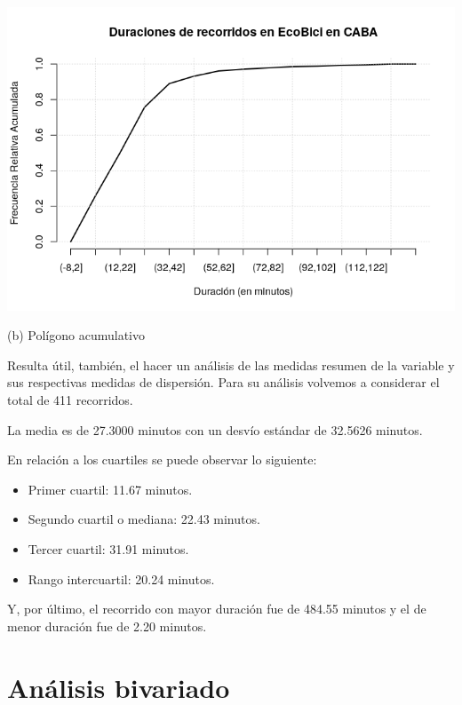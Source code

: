 \documentclass[11pt]{article}
\begin{document}
    \begin{center}
      \includegraphics[scale=0.55]{PoligAcumDuracion.png}
      \vspace{-4mm}
  
      (b) Pol\'igono acumulativo
    \end{center}

    Resulta \'util, tambi\'en, el hacer un an\'alisis de las medidas resumen de la variable y sus respectivas medidas de dispersi\'on.
    Para su an\'alisis volvemos a considerar el total de 411 recorridos.

    La media es de 27.3000 minutos con un desv\'io est\'andar de 32.5626 minutos. 

    En relaci\'on a los cuartiles se puede observar lo siguiente:

    \begin{itemize}
      \item Primer cuartil: 11.67 minutos.
      \item Segundo cuartil o mediana: 22.43 minutos.
      \item Tercer cuartil: 31.91 minutos.
      \item Rango intercuartil: 20.24 minutos.
    \end{itemize}

    Y, por \'ultimo, el recorrido con mayor duraci\'on fue de 484.55 minutos y el de menor duraci\'on fue de 2.20 minutos.

    \section{An\'alisis bivariado}
\end{document}
